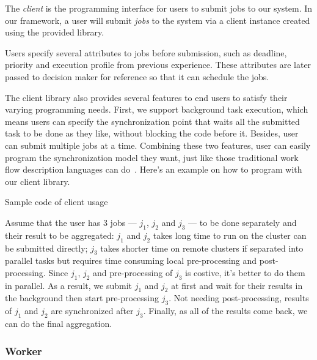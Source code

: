 The {\em client} is the programming interface for users to submit jobs
to our system.
In our framework, a user will submit {\em jobs} to the system via a
client instance created using the provided library.

Users specify several attributes to jobs before submission, such as
deadline, priority and execution profile from previous experience.
These attributes are later passed to decision maker for reference so
that it can schedule the jobs.

The client library also provides several features to end users to
satisfy their varying programming needs.
First, we support background task execution, which means users can
specify the synchronization point that waits all the submitted task to
be done as they like, without blocking the code before it.
Besides, user can submit multiple jobs at a time.
Combining these two features, user can easily program the
synchronization model they want, just like those traditional work flow
description languages can do~\cite{cite:workflow-management}.
Here's an example on how to program with our client library.

\begin{Example Code}
  
  \caption{Sample code of client usage}
\end{Example Code}

Assume that the user has 3 jobs --- $j_1$, $j_2$ and $j_3$ --- to be
done separately and their result to be aggregated:  $j_1$ and $j_2$
takes long time to run on the cluster can be submitted directly; $j_3$
takes shorter time on remote clusters if separated into parallel tasks
but requires time consuming local pre-processing and post-processing.
Since $j_1$, $j_2$ and pre-processing of $j_3$ is costive, it's better
to do them in parallel.
As a result, we submit $j_1$ and $j_2$ at first and wait for their
results in the background then start pre-processing $j_3$.
Not needing post-processing, results of $j_1$ and $j_2$ are synchronized
after $j_3$.
Finally, as all of the results come back, we can do the final
aggregation.


\subsubsection{Worker}	%

